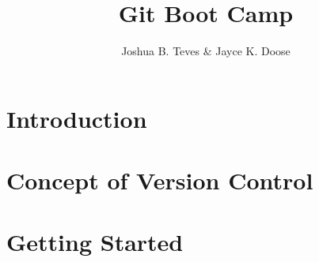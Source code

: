 \documentclass[12pt]{book}
\title{Git Boot Camp}
\author{Joshua B. Teves \& Jayce K. Doose}
\begin{document}
\maketitle

\tableofcontents

\chapter*{Introduction}


\chapter{Concept of Version Control}


\chapter{Getting Started}

\end{document}
